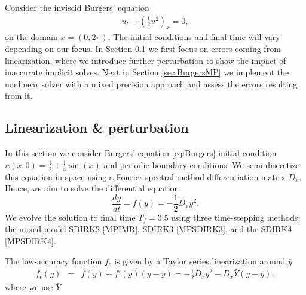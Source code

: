 \documentclass{siamart251104}
\newcommand{\ybar}{\bar{y}}
\begin{document}
Consider the inviscid Burgers' equation
 \begin{eqnarray} \label{eq:Burgers}
     u_t + \left( \frac{1}{2} u^2 \right)_x =0,
 \end{eqnarray} 
 on the domain $x = (0,2\pi)$. The initial conditions and final time will vary 
 depending on our focus. In Section \ref{sec:BurgersLin} we first focus on errors coming from linearization,  where we introduce further perturbation  to show the impact of inaccurate implicit solves. 
Next in Section \ref{sec:BurgersMP} we implement the nonlinear solver with a 
mixed precision approach and  assess the errors resulting from it.


 \subsection{Linearization \& perturbation} \label{sec:BurgersLin}
In this section we consider Burgers' equation \eqref{eq:Burgers}
 initial condition $u(x,0)= \frac{1}{2} + \frac{1}{4} \sin(x)$ 
 and periodic boundary conditions. 
 We semi-discretize this equation in space using a Fourier spectral 
 method differentiation matrix $D_x$. 
 Hence, we aim to solve the differential equation
 \[ \frac{dy}{dt} = f(y) = - \frac{1}{2} D_x y^{2}.\]
 We evolve the solution to final time $T_f = 3.5$ 
using three time-stepping methods:
the mixed-model SDIRK2 \eqref{MPIMR},
 SDIRK3 \eqref{MPSDIRK3}, 
and the SDIRK4  \eqref{MPSDIRK4}.

 The low-accuracy function $f_\epsilon$ is given by a Taylor series linearization
 around $\ybar$
 \begin{eqnarray}\label{linB3}
f_{\epsilon}(y) &=&  f(\bar{y}) + 
    f'(\bar{y}) \left( y - \bar{y} \right) 
    =  - \frac{1}{2} D_x \bar{y}^2
    - D_x \bar{Y} \left( y - \bar{y} \right) ,
    \end{eqnarray}
where we use $\bar{Y}$.
\end{document}
